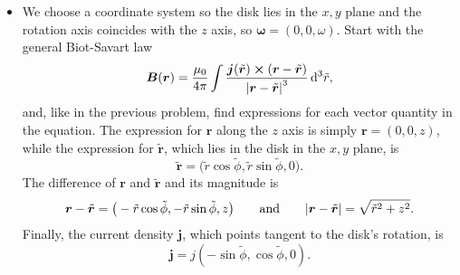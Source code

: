 \documentclass[11pt, a4paper]{article}
\newcommand{\diff}{\mathop{}\!\mathrm{d}} %
\newcommand{\eqtext}[1]{\qquad \text{#1} \qquad}
\renewcommand{\vec}[1]{\bm{#1}} %
\newcommand{\tvec}[1]{\tilde{\vec{#1}}} %
\renewcommand{\t}[1]{\tilde{#1}} %
\renewcommand{\r}{\vec{r}}
\newcommand{\B}{\vec{B}}  %
\begin{document}
\begin{itemize}
	\item We choose a coordinate system so the disk lies in the $ x, y $ plane and the rotation axis coincides with the $ z $ axis, so $ \bm{\omega} = (0, 0, \omega) $. Start with the general Biot-Savart law
	\begin{equation*}
		\B (\r) = \frac{\mu_{0}}{4\pi}\int \frac{\vec{j}(\tvec{r}) \cross (\r - \tvec{r})}{\abs{\r - \tvec{r}}^{3}} \diff^{3}\tilde{r},
	\end{equation*}
	and, like in the previous problem, find expressions for each vector quantity in the equation. The expression for $ \r $ along the $ z $ axis is simply $ \r = (0, 0, z) $, while the expression for $ \tvec{r} $, which lies in the disk in the $ x, y $ plane, is
	\begin{equation*}
		\tvec{r} = \big(\tilde{r} \cos \tilde{\phi}, \tilde{r} \sin \tilde{\phi}, 0 \big).
	\end{equation*}
	The difference of $ \r $ and $ \tvec{r} $ and its magnitude is
	\begin{equation*}
		\r - \tvec{r} = \big(-\tilde{r} \cos \tilde{\phi}, - \tilde{r} \sin \tilde{\phi}, z \big) \eqtext{and} \abs{\r - \tvec{r}} = \sqrt{\tilde{r}^{2} + z^{2}}.
	\end{equation*}
	Finally, the current density $ \vec{j} $, which points tangent to the disk's rotation, is
	\begin{equation*}
		\vec{j} = j(-\sin \t{\phi}, \cos \t{\phi},0 ).
	\end{equation*}
	

\end{itemize}
\end{document}
